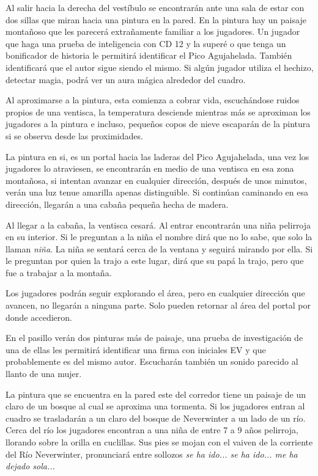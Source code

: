 \documentclass[10pt,twoside,twocolumn,openany]{dndbook}
\begin{document}

Al salir hacia la derecha del vestíbulo se encontrarán ante una sala de estar con dos sillas 
que miran hacia una pintura en la pared. En la pintura hay un paisaje montañoso que les parecerá
extrañamente familiar a los jugadores. Un jugador que haga una prueba de inteligencia con CD 12 
y la superé o que tenga un bonificador de historia le permitirá identificar el Pico Agujahelada.
También identificará que el autor sigue siendo el mismo. Si algún jugador utiliza el hechizo,
detectar magia, podrá ver un aura mágica alrededor del cuadro.

Al aproximarse a la pintura, esta comienza a cobrar vida, escuchándose ruidos propios de una 
ventisca, la temperatura desciende mientras más se aproximan los jugadores a la pintura e incluso,
pequeños copos de nieve escaparán de la pintura si se observa desde las proximidades.

La pintura en si, es un portal hacia las laderas del Pico Agujahelada, una vez los jugadores lo
atraviesen, se encontrarán en medio de una ventisca en esa zona montañosa, si intentan avanzar 
en cualquier dirección, después de unos minutos, verán una luz tenue amarilla apenas distinguible.
Si continúan caminando en esa dirección, llegarán a una cabaña pequeña hecha de madera. 

Al llegar a la cabaña, la ventisca cesará. Al entrar encontrarán una niña pelirroja en su interior.
Si le preguntan a la niña el nombre dirá que no lo sabe, que solo la llaman \emph{niña}. La niña
se sentará cerca de la ventana y seguirá mirando por ella. Si le preguntan por quien la
trajo a este lugar, dirá que su papá la trajo, pero que fue a trabajar a la montaña.

Los jugadores podrán seguir explorando el área, pero en cualquier dirección que avancen, no 
llegarán a ninguna parte. Solo pueden retornar al área del portal por donde accedieron.


En el pasillo verán dos pinturas más de paisaje, una prueba de investigación de una de ellas
les permitirá identificar una firma con iniciales EV y que probablemente es del mismo autor.
Escucharán también un sonido parecido al llanto de una mujer.

La pintura que se encuentra en la pared este del corredor tiene un paisaje de un claro de un 
bosque al cual se aproxima una tormenta. Si los jugadores entran al cuadro se trasladarán 
a un claro del bosque de Neverwinter a un lado de un río. Cerca del río los jugadores
encontran a una niña de entre 7 a 9 años pelirroja, llorando sobre la orilla en cuclillas.
Sus pies se mojan con el vaiven de la corriente del Río Neverwinter, pronunciará entre sollozos
\emph{se ha ido... se ha ido... me ha dejado sola...}
\end{document}
